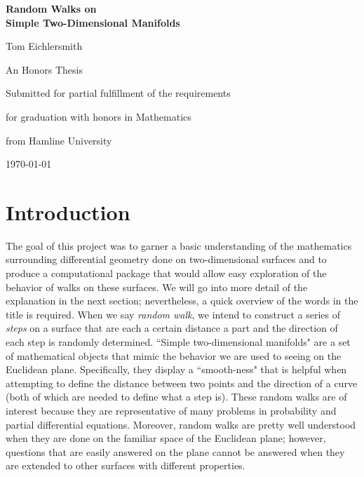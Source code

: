 \documentclass[12pt]{article}
\begin{document}
\begin{titlepage}
	\centering
	\vspace*{\fill}
	{\LARGE\bfseries Random Walks on\\ Simple Two-Dimensional Manifolds\par}
	\vspace{5cm}
	{\large Tom Eichlersmith\par}
	\vspace{5cm}
	An Honors Thesis\par
	Submitted for partial fulfillment of the requirements\par
	for graduation with honors in Mathematics\par
	from Hamline University\par
	\vspace{1em}
	{\today\par}
	\vspace*{\fill}
\end{titlepage}

\section{Introduction}
	The goal of this project was to garner a basic understanding of the mathematics surrounding differential geometry done on two-dimensional surfaces and to produce a computational package that would allow easy exploration of the behavior of walks on these surfaces.
	We will go into more detail of the explanation in the next section; nevertheless, a quick overview of the words in the title is required.
	When we say \emph{random walk}, we intend to construct a series of \emph{steps} on a surface that are each a certain distance a part and the direction of each step is randomly determined. 
	``Simple two-dimensional manifolds" are a set of mathematical objects that mimic the behavior we are used to seeing on the Euclidean plane.
	Specifically, they display a ``smooth-ness" that is helpful when attempting to define the distance between two points and the direction of a curve (both of which are needed to define what a step is).
	These random walks are of interest because they are representative of many problems in probability and partial differential equations.
	Moreover, random walks are pretty well understood when they are done on the familiar space of the Euclidean plane; however, questions that are easily answered on the plane cannot be answered when they are extended to other surfaces with different properties.
	
\end{document}
